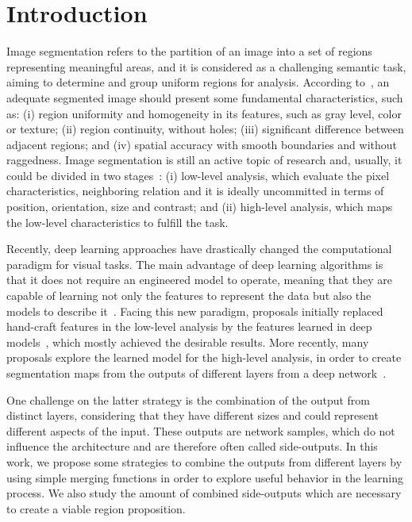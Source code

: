 \section{Introduction}
\label{sec:intro}

Image segmentation refers to the partition of an image into a set of regions representing  meaningful areas, and it is considered as a challenging semantic task, aiming to determine and group uniform regions for analysis. According to~\cite{DOMINGUEZ}, an adequate segmented image should present some fundamental characteristics, such as: (i) region uniformity and homogeneity in  its features, such as gray level, color or texture; (ii) region continuity, without holes; (iii) significant difference between adjacent regions; and (iv) spatial accuracy with smooth boundaries and without raggedness. Image segmentation is still an active topic of research and, usually, it could be divided in two stages~\cite{guigues06}: (i) low-level analysis, which evaluate the pixel characteristics, neighboring relation and it is ideally uncommitted in terms of position, orientation, size and contrast; and (ii) high-level analysis, which maps the low-level characteristics to fulfill the task.  

Recently, deep learning approaches have drastically changed the computational paradigm for visual tasks. The main advantage of deep learning algorithms is that it does not require an engineered model to operate, meaning that they are capable of learning not only the features to represent the data but also the models to describe it~\cite{goodfellow16}. Facing this new paradigm, proposals initially replaced  hand-craft features in the low-level analysis by the features learned in deep models~\cite{farabet2013,simonyan2014,lee2015}, which mostly achieved the desirable results. More recently, many proposals explore the learned model for the high-level analysis, in order to create segmentation maps from the outputs of different layers from a deep network~\cite{xie2017,cheng2016,maninis2017,liu2017}. 

One challenge on the latter strategy is the combination of the output from distinct layers, considering that they have different sizes and could represent different aspects of the input. These outputs are network samples, which do not influence the architecture and are therefore often called side-outputs. In this work, we propose some strategies to combine the outputs from different layers by using simple merging functions in order to explore useful behavior in the learning process. We also study the amount of combined side-outputs which are necessary to create a viable region proposition. 


